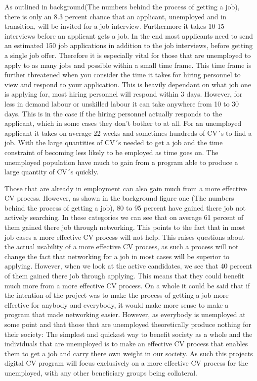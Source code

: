 As outlined in background(The numbers behind the process of getting a job), there is only an 8.3 percent chance that an applicant, unemployed and in transition, will be invited for a job interview.
Furthermore it takes 10-15 interviews before an applicant gets a job.
In the end most applicants need to send an estimated 150 job applications in addition to the job interviews, before getting a single job offer.
Therefore it is especially vital for those that are unemployed to apply to as many jobs and possible within a small time frame. 
This time frame is further threatened when you consider the time it takes for hiring personnel to view and respond to your application.
This is heavily dependant on what job one is applying for, most hiring personnel will respond within 3 days. 
However, for less in demand labour or unskilled labour it can take anywhere from 10 to 30 days. 
This is in the case if the hiring personnel actually responds to the applicant, which in some cases they don't bother to at all.
For an unemployed applicant it takes on average 22 weeks and sometimes hundreds of CV´s to find a job. 
With the large quantities of CV´s needed to get a job and the time constraint of becoming less likely to be employed as time goes on.
The unemployed population have much to gain from a program able to produce a large quantity of CV´s quickly.

Those that are already in employment can also gain much from a more effective CV process.
However, as shown in the background figure one (The numbers behind the process of getting a job), 80 to 95 percent have gained there job not actively searching.
In these categories we can see that on average 61 percent of them gained there job through networking. 
This points to the fact that in most job cases a more effective CV process will not help.
This raises questions about the actual usability of a more effective CV process, as such a process will not change the fact that networking for a job in most cases will be superior to applying.
However, when we look at the active candidates, we see that 40 percent of them gained there job through applying. 
This means that they could benefit much more from a more effective CV process.
On a whole it could be said that if the intention of the project was to make the process of getting a job more effective for anybody and everybody, it would make more sense to make a program that made networking easier.
However, as everybody is unemployed at some point and that those that are unemployed theoretically produce nothing for their society:
The simplest and quickest way to benefit society as a whole and the individuals that are unemployed is to make an effective CV process that enables them to get a job and carry there own weight in our society.
As such this projects digital CV program will focus exclusively on a more effective CV process for the unemployed, with any other beneficiary groups being collateral.

